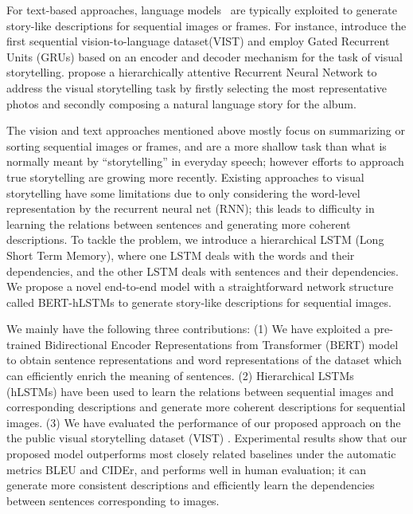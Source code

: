\documentclass[a4paper,fleqn]{cas-sc}
\begin{document}
For text-based approaches, language models~\citep{Huang2016,Yulicheng2017,li2019stable} are typically exploited to generate story-like descriptions for sequential images or frames. For instance, \citet{Huang2016} introduce the first sequential vision-to-language dataset(VIST) and employ Gated Recurrent Units (GRUs) \citep{Cho2014Learning} based on an encoder and decoder mechanism for the task of visual storytelling. \cite{Yulicheng2017} propose a hierarchically attentive Recurrent Neural Network to address the visual storytelling task by firstly selecting the most representative photos and secondly composing a natural language story for the album. 

The vision and text approaches mentioned above mostly focus on summarizing or sorting sequential images or frames, and are a more shallow task than what is normally meant by  ``storytelling'' in everyday speech; however efforts to approach true storytelling are growing more recently. Existing approaches to visual storytelling have some limitations due to only considering the word-level representation by the recurrent neural net (RNN); this leads to difficulty in learning the relations between sentences and generating more coherent descriptions. To tackle the problem, we introduce a hierarchical LSTM (Long Short Term Memory), where one LSTM deals with the words and their dependencies, and the other LSTM deals with sentences and their dependencies. We propose a novel end-to-end model with a straightforward network structure called BERT-hLSTMs to generate story-like descriptions for sequential images. 

We mainly have the following three contributions: (1) We have exploited a pre-trained Bidirectional Encoder Representations from Transformer (BERT) model \citep{BERT2018} to obtain sentence representations and word representations of the dataset which can efficiently enrich the meaning of sentences. (2) Hierarchical LSTMs (hLSTMs) have been used to learn the relations between sequential images and corresponding descriptions and generate more coherent descriptions for sequential images. (3) We have evaluated the performance of our proposed approach on the the public visual storytelling dataset (VIST) \citep{Huang2016}. Experimental results show that our proposed model outperforms most closely related baselines under the automatic metrics BLEU and CIDEr, and performs well in human evaluation; it can generate more consistent descriptions and efficiently learn the dependencies between sentences corresponding to images.
\end{document}
